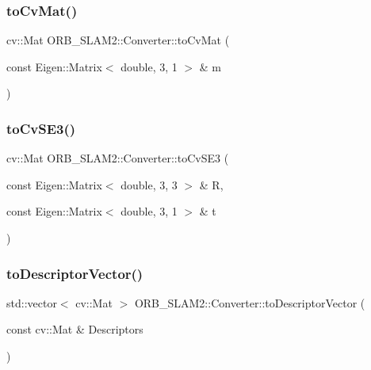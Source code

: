 \subsubsection{\texorpdfstring{to\+Cv\+Mat()}{toCvMat()}\hspace{0.1cm}{\footnotesize\ttfamily [5/5]}}
{\footnotesize\ttfamily cv\+::\+Mat O\+R\+B\+\_\+\+S\+L\+A\+M2\+::\+Converter\+::to\+Cv\+Mat (\begin{DoxyParamCaption}\item[{const Eigen\+::\+Matrix$<$ double, 3, 1 $>$ \&}]{m }\end{DoxyParamCaption})\hspace{0.3cm}{\ttfamily [static]}}

\mbox{\label{class_o_r_b___s_l_a_m2_1_1_converter_a0972ca8f56ea15c1814f51be3804978f}} 
\subsubsection{\texorpdfstring{to\+Cv\+S\+E3()}{toCvSE3()}}
{\footnotesize\ttfamily cv\+::\+Mat O\+R\+B\+\_\+\+S\+L\+A\+M2\+::\+Converter\+::to\+Cv\+S\+E3 (\begin{DoxyParamCaption}\item[{const Eigen\+::\+Matrix$<$ double, 3, 3 $>$ \&}]{R,  }\item[{const Eigen\+::\+Matrix$<$ double, 3, 1 $>$ \&}]{t }\end{DoxyParamCaption})\hspace{0.3cm}{\ttfamily [static]}}

\mbox{\label{class_o_r_b___s_l_a_m2_1_1_converter_abef47701eefdbc74c2c1625c140963fd}} 
\subsubsection{\texorpdfstring{to\+Descriptor\+Vector()}{toDescriptorVector()}}
{\footnotesize\ttfamily std\+::vector$<$ cv\+::\+Mat $>$ O\+R\+B\+\_\+\+S\+L\+A\+M2\+::\+Converter\+::to\+Descriptor\+Vector (\begin{DoxyParamCaption}\item[{const cv\+::\+Mat \&}]{Descriptors }\end{DoxyParamCaption})\hspace{0.3cm}{\ttfamily [static]}}




